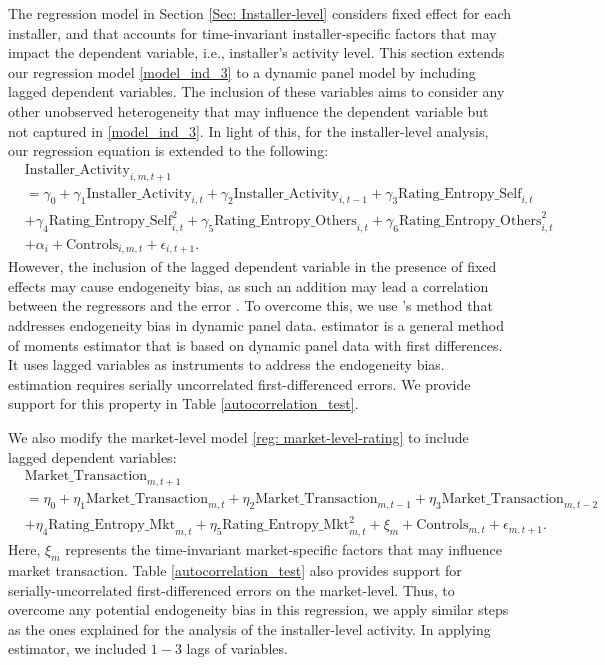 \documentclass[msom,blindrev]{informs3}
\begin{document}
	The regression model in Section \ref{Sec: Installer-level} considers fixed effect for each installer, and that accounts for time-invariant installer-specific factors that may impact the dependent variable, i.e., installer's activity level. This section extends our regression model  \eqref{model_ind_3} to a dynamic panel model by including lagged dependent variables. The inclusion of these variables aims to consider any other unobserved heterogeneity that may influence the dependent variable but not captured in  \eqref{model_ind_3}. In light of this, for the installer-level analysis, our regression equation is extended to the following:
	\begin{align} \nonumber
	&\text{Installer\_Activity}_{i,m,t+1} \\ \nonumber
	&=\gamma_{0}+\gamma_{1} \text{Installer\_Activity}_{i,t}+ \gamma_{2}\text{Installer\_Activity}_{i,t-1}+
	\gamma_{3} \text{Rating\_Entropy\_Self}_{i,t} \\ \nonumber
	&+ \gamma_{4} \text{Rating\_Entropy\_Self}_{i,t}^ {2} + \gamma_{5} \text{Rating\_Entropy\_Others}_{i,t}  + \gamma_{6} \text{Rating\_Entropy\_Others}_{i,t}^{2} \\ \label{eq: extended_ind}
	&+ \alpha_{i}+ \text{Controls}_{i,m,t}+ \epsilon_{i,t+1}.
	\end{align}
However,  the inclusion of the lagged dependent variable in the presence of fixed effects may cause endogeneity bias, as such an addition may lead a correlation between the regressors and the error \citep{nickell1981biases}. To overcome this, we use \cite{arellano1991some}'s method that addresses endogeneity bias in dynamic panel data. \cite{arellano1991some} estimator is a general method of moments estimator that is based on dynamic panel data with first differences. It uses lagged variables as instruments to address the endogeneity bias. \cite{arellano1991some} estimation requires serially uncorrelated first-differenced errors. We provide support for this property in Table \ref{autocorrelation_test}.
	
We also modify the market-level model \eqref{reg: market-level-rating} to include lagged dependent variables:
	\begin{align} \nonumber
	&\text{Market\_Transaction}_{m,t+1}\\ \nonumber
	& =\eta_{0}+ \eta_{1} \text{Market\_Transaction}_{m,t}+ \eta_{2} \text{Market\_Transaction}_{m,t-1} + \eta_{3} \text{Market\_Transaction}_{m,t-2} \\ \label{eq: ext_market_level}
	&+ \eta_{4} \text{Rating\_Entropy\_Mkt}_{m,t}+ \eta_{5}\text{Rating\_Entropy\_Mkt}_{m,t} ^2 + \xi_{m}+ \text{Controls}_{m,t}  +\epsilon_{m,t+1}.
	\end{align}
	Here, $\xi_{m}$ represents the time-invariant market-specific factors that may influence market transaction.  Table \ref{autocorrelation_test} also provides support for serially-uncorrelated first-differenced errors on the market-level. Thus, to overcome any potential endogeneity bias in this regression, we apply similar steps as the ones explained for the analysis of the installer-level activity. In applying  \cite{arellano1991some} estimator, we included $1-3$ lags of variables.
	
\end{document}
